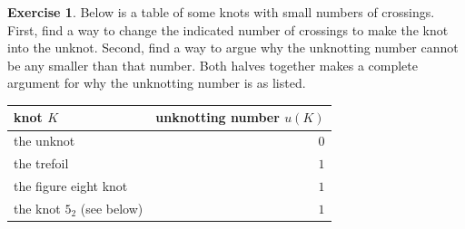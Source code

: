 \documentclass[12pt,letterpaper]{article}
\theoremstyle{definition}
\newtheorem{exercise}[question]{Exercise}
\begin{document}
\begin{exercise}
Below is a table of some knots with small numbers of crossings.
First, find a way to change the indicated number of crossings to make the knot into the unknot.
Second, find a way to argue why the unknotting number cannot be any smaller than that number.
Both halves together makes a complete argument for why the unknotting number is as listed.
\end{exercise}
\begin{center}
\begin{tabular}{lr}
knot $K$ & unknotting number $u(K)$ \\
\hline
the unknot & $0$ \\
the trefoil & $1$ \\
the figure eight knot & $1$ \\
the knot $5_2$ (see below) & $1$
\end{tabular}
\end{center}
\end{document}
